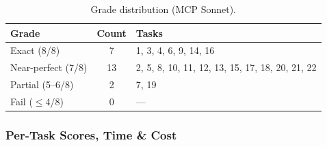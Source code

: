 \begin{table}[h]
\centering
\caption{Grade distribution (MCP Sonnet).}\label{tab:grade-mcp-sonnet}
\begin{tabular}{lcl}
\toprule
\textbf{Grade} & \textbf{Count} & \textbf{Tasks} \\
\midrule
Exact (8/8)        &  7 & 1, 3, 4, 6, 9, 14, 16 \\
Near-perfect (7/8) & 13 & 2, 5, 8, 10, 11, 12, 13, 15, 17, 18, 20, 21, 22 \\
Partial (5--6/8)   &  2 & 7, 19 \\
Fail ($\le$4/8)    &  0 & --- \\
\bottomrule
\end{tabular}
\end{table}

\subsubsection{Per-Task Scores, Time \& Cost}

